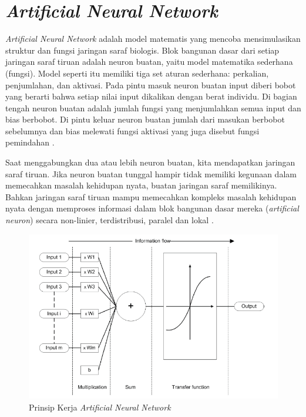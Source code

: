 \section{\emph{Artificial Neural Network}}
\emph{Artificial Neural Network} adalah model matematis yang mencoba mensimulasikan struktur dan fungsi jaringan saraf biologis. Blok bangunan dasar dari setiap
jaringan saraf tiruan adalah neuron buatan, yaitu model matematika sederhana (fungsi). Model seperti itu memiliki tiga set aturan sederhana: perkalian, penjumlahan, dan aktivasi.
Pada pintu masuk neuron buatan input diberi bobot yang berarti bahwa setiap nilai input dikalikan dengan berat individu. Di bagian tengah neuron buatan adalah jumlah
fungsi yang menjumlahkan semua input dan bias berbobot. Di pintu keluar neuron buatan jumlah dari masukan berbobot sebelumnya dan bias melewati fungsi aktivasi yang juga disebut
fungsi pemindahan \citep{ANN}.

Saat menggabungkan dua atau lebih neuron buatan, kita mendapatkan jaringan saraf tiruan. Jika neuron buatan tunggal hampir tidak memiliki kegunaan dalam memecahkan masalah kehidupan nyata, buatan
jaringan saraf memilikinya. Bahkan jaringan saraf tiruan mampu memecahkan kompleks masalah kehidupan nyata dengan memproses informasi dalam blok bangunan dasar mereka (\emph{artificial neuron})
secara non-linier, terdistribusi, paralel dan lokal \citep{ANN}.

\begin{figure} [ht] \centering
  \includegraphics{gambar/ann.png}
  \vspace*{3mm}
  \caption{Prinsip Kerja \emph{Artificial Neural Network} \citep{ANN}}
\end{figure}


